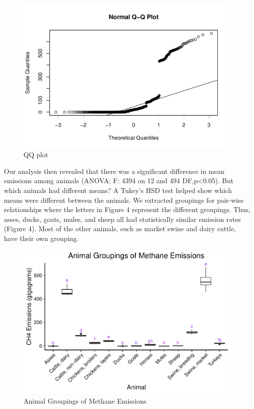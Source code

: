 \documentclass[
  12pt,
]{article}
\begin{document}
\begin{figure}
\centering
\includegraphics{Methane_Project_Template_files/figure-latex/unnamed-chunk-4-1.pdf}
\caption{QQ plot}
\end{figure}

Our analysis then revealed that there was a significant difference in
mean emissions among animals (ANOVA; F: 4394 on 12 and 494
DF,p\textless0.05). But which animals had different means? A Tukey's HSD
test helped show which means were different between the animals. We
extracted groupings for pair-wise relationships where the letters in
Figure 4 represent the different groupings. Thus, asses, ducks, goats,
mules, and sheep all had statistically similar emission rates (Figure
4). Most of the other animals, such as market swine and dairy cattle,
have their own grouping.

\begin{figure}
\centering
\includegraphics{Methane_Project_Template_files/figure-latex/anova results-1.pdf}
\caption{Animal Groupings of Methane Emissions}
\end{figure}
\end{document}
